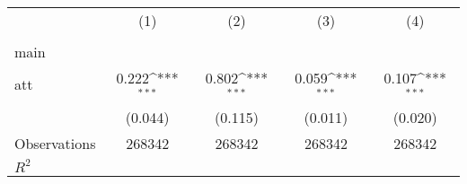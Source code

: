 {
\def\sym#1{\ifmmode^{#1}\else\(^{#1}\)\fi}
\begin{tabular}{l*{4}{c}}
\hline\hline
                    &\multicolumn{1}{c}{(1)}&\multicolumn{1}{c}{(2)}&\multicolumn{1}{c}{(3)}&\multicolumn{1}{c}{(4)}\\
                    &\multicolumn{1}{c}{} &\multicolumn{1}{c}{} &\multicolumn{1}{c}{} &\multicolumn{1}{c}{} \\
\hline
main                &                     &                     &                     &                     \\
att                 &       0.222\sym{***}&       0.802\sym{***}&       0.059\sym{***}&       0.107\sym{***}\\
                    &     (0.044)         &     (0.115)         &     (0.011)         &     (0.020)         \\
\hline
Observations        &      268342         &      268342         &      268342         &      268342         \\
\(R^{2}\)           &                     &                     &                     &                     \\
\hline\hline
\end{tabular}
}
